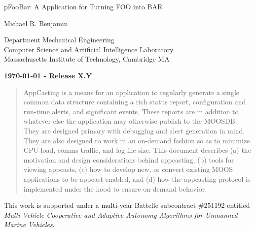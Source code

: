\documentclass[onecolumn,letterpaper,11pt]{article}
\begin{document}
\begin{center}
\begin{huge}
pFooBar: A Application for Turning FOO into BAR

\end{huge}

\vspace{0.5in}

\begin{Large}
Michael R. Benjamin                                     \\
\end{Large}
\begin{large}
Department Mechanical Engineering                       \\ 
Computer Science and Artificial Intelligence Laboratory \\
Massachusetts Institute of Technology, Cambridge MA     \\
\end{large}
\vspace{0.25cm} 

{\bf {\today} - Release X.Y} \\
 
\end{center}

\begin{abstract}
AppCasting is a means for an application to regularly generate a
single common data structure containing a rich status report,
configuration and run-time alerts, and significant events. These
reports are in addition to whatever else the application may otherwise
publish to the MOOSDB. They are designed primary with debugging and
alert generation in mind. They are also designed to work in an
on-demand fashion so as to minimize CPU load, comms traffic, and log
file size. This document describes (a) the motivation and design
considerations behind appcasting, (b) tools for viewing appcasts, (c)
how to develop new, or convert existing MOOS applications to be
appcast-enabled, and (d) how the appcasting protocol is implemented
under the hood to ensure on-demand behavior.
\end{abstract}

\vspace{0.4in}

\noindent
This work is supported under a multi-year Battelle
subcontract \#251192 entitled {\em Multi-Vehicle Cooperative and Adaptive
Autonomy Algorithms for Unmanned Marine Vehicles}. 

\vspace{0.18in}

\newpage
\tableofcontents

\newpage

\newpage

\end{document}
